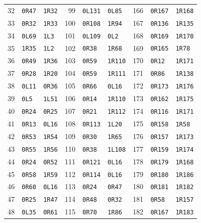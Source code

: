 \begin{longtable}{@{}rllrllrll@{}}
32 & \texttt{0R47} & \texttt{1R32} & 99 & \texttt{0L131} & \texttt{0L85} & 166 & \texttt{0R167} & \texttt{1R168}\\
33 & \texttt{0R32} & \texttt{1R33} & 100 & \texttt{0R108} & \texttt{1R94} & 167 & \texttt{0R136} & \texttt{1R135}\\
34 & \texttt{0L69} & \texttt{1L3} & 101 & \texttt{0L109} & \texttt{0L2} & 168 & \texttt{0R169} & \texttt{1R170}\\
35 & \texttt{1R35} & \texttt{1L2} & 102 & \texttt{0R38} & \texttt{1R68} & 169 & \texttt{0R165} & \texttt{1R78}\\
36 & \texttt{0R49} & \texttt{1R36} & 103 & \texttt{0R59} & \texttt{1R110} & 170 & \texttt{0R12} & \texttt{1R171}\\
37 & \texttt{0R28} & \texttt{1R20} & 104 & \texttt{0R59} & \texttt{1R111} & 171 & \texttt{0R86} & \texttt{1R138}\\
38 & \texttt{0L11} & \texttt{0R36} & 105 & \texttt{0R66} & \texttt{0L16} & 172 & \texttt{0R173} & \texttt{1R176}\\
39 & \texttt{0L5} & \texttt{1L51} & 106 & \texttt{0R14} & \texttt{1R110} & 173 & \texttt{0R162} & \texttt{1R175}\\
40 & \texttt{0R24} & \texttt{0R25} & 107 & \texttt{0R21} & \texttt{1R112} & 174 & \texttt{0R116} & \texttt{1R171}\\
41 & \texttt{0R13} & \texttt{0L16} & 108 & \texttt{0R113} & \texttt{1L20} & 175 & \texttt{0R158} & \texttt{1R58}\\
42 & \texttt{0R53} & \texttt{1R54} & 109 & \texttt{0R30} & \texttt{1R65} & 176 & \texttt{0R157} & \texttt{1R173}\\
43 & \texttt{0R55} & \texttt{1R56} & 110 & \texttt{0R38} & \texttt{1L108} & 177 & \texttt{0R159} & \texttt{1R174}\\
44 & \texttt{0R24} & \texttt{0R52} & 111 & \texttt{0R121} & \texttt{0L16} & 178 & \texttt{0R179} & \texttt{1R168}\\
45 & \texttt{0R58} & \texttt{1R59} & 112 & \texttt{0R114} & \texttt{0L16} & 179 & \texttt{0R180} & \texttt{1R186}\\
46 & \texttt{0R60} & \texttt{0L16} & 113 & \texttt{0R24} & \texttt{0R47} & 180 & \texttt{0R181} & \texttt{1R182}\\
47 & \texttt{0R25} & \texttt{1R47} & 114 & \texttt{0R48} & \texttt{0R32} & 181 & \texttt{0R58} & \texttt{1R157}\\
48 & \texttt{0L35} & \texttt{0R61} & 115 & \texttt{0R70} & \texttt{1R86} & 182 & \texttt{0R167} & \texttt{1R183}\\

\end{longtable}
